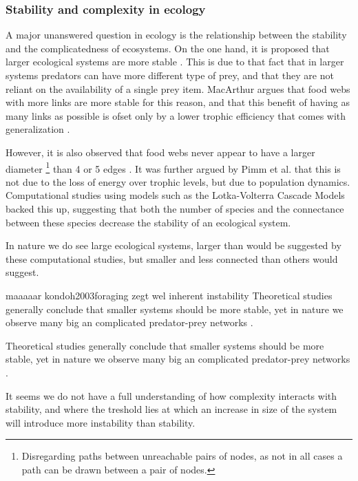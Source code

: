 \documentclass[../main.tex]{subfiles}
\begin{document}
\subsubsection{Stability and complexity in ecology}

A major unanswered question in ecology is the relationship between the stability and the complicatedness of ecosystems.
On the one hand, it is proposed that larger ecological systems are more stable \cite{macarthur1955fluctuations}.
This is due to that fact that in larger systems predators can have more different type of prey, and that they are not reliant on the availability of a single prey item.
MacArthur argues that food webs with more links are more stable for this reason, and that this benefit of having as many links as possible is ofset only by a lower trophic efficiency that comes with generalization  \cite{macarthur1955fluctuations}.

However, it is also observed that food webs never appear to have a larger diameter \footnote{Disregarding paths between unreachable pairs of nodes, as not in all cases a path can be drawn between a pair of nodes.} than 4 or 5 edges \cite{pimm1977number}.
It was further argued by Pimm et al. that this is not due to the loss of energy over trophic levels, but due to population dynamics.
Computational studies using models such as the Lotka-Volterra Cascade Models backed this up, suggesting that both the number of species and the connectance between these species decrease the stability of an ecological system.



In nature we do see large ecological systems, larger than would be suggested by these computational studies, but smaller and less connected than others would suggest.

maaaaar kondoh2003foraging zegt wel inherent instability
Theoretical studies generally conclude that smaller systems should be more stable, yet in nature we observe many big an complicated predator-prey networks \cite{kondoh2003foraging}.




Theoretical studies generally conclude that smaller systems should be more stable, yet in nature we observe many big an complicated predator-prey networks \cite{kondoh2003foraging}.

It seems we do not have a full understanding of how complexity interacts with stability, and where the treshold lies at which an increase in size of the system will introduce more instability than stability.
\end{document}
